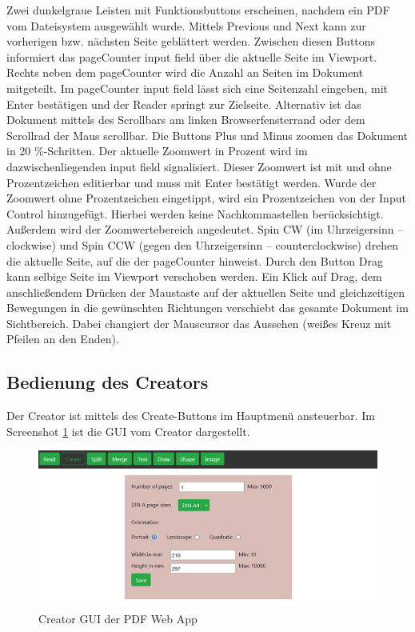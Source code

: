 Zwei dunkelgraue Leisten mit Funktionsbuttons erscheinen, nachdem ein PDF vom Dateisystem ausgewählt wurde. Mittels Previous und Next kann zur vorherigen bzw. nächsten Seite geblättert werden. Zwischen diesen Buttons informiert das pageCounter input field über die aktuelle Seite im Viewport. Rechts neben dem pageCounter wird die Anzahl an Seiten im Dokument mitgeteilt. Im pageCounter input field lässt sich eine Seitenzahl eingeben, mit Enter bestätigen und der Reader springt zur Zielseite. Alternativ ist das Dokument mittels des Scrollbars am linken Browserfensterrand oder dem Scrollrad der Maus scrollbar. Die Buttons Plus und Minus zoomen das Dokument in 20 \%-Schritten. Der aktuelle Zoomwert in Prozent wird im dazwischenliegenden input field signalisiert. Dieser Zoomwert ist mit und ohne Prozentzeichen editierbar und muss mit Enter bestätigt werden. Wurde der Zoomwert ohne Prozentzeichen eingetippt, wird ein Prozentzeichen von der Input Control hinzugefügt. Hierbei werden keine Nachkommastellen berücksichtigt. Außerdem wird der Zoomwertebereich angedeutet. Spin CW (im Uhrzeigersinn – clockwise) und Spin CCW (gegen den Uhrzeigersinn – counterclockwise) drehen die aktuelle Seite, auf die der pageCounter hinweist. Durch den Button Drag kann selbige Seite im Viewport verschoben werden. Ein Klick auf Drag, dem anschließendem Drücken der Maustaste auf der aktuellen Seite und gleichzeitigen Bewegungen in die gewünschten Richtungen verschiebt das gesamte Dokument im Sichtbereich. Dabei changiert der Mauscursor das Aussehen (weißes Kreuz mit Pfeilen an den Enden).

\subsection{Bedienung des Creators}
Der Creator ist mittels des Create-Buttons im Hauptmenü ansteuerbar. Im Screenshot \ref{fig:creator} ist die GUI vom Creator dargestellt. 

\begin{figure}[!htbp]
	\centering
	\includegraphics[width=1\textwidth]{"images/creator.png"}
	\caption{Creator GUI der PDF Web App}
	\label{fig:creator}
\end{figure}

